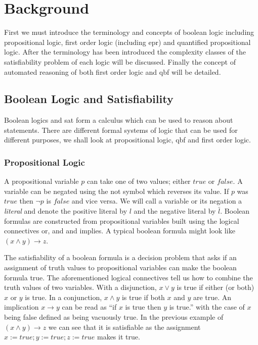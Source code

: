 \chapter{Background}
First we must introduce the terminology and concepts of boolean logic including propositional logic, first order logic (including \gls{epr}) and quantified propositional logic.
After the terminology has been introduced the complexity classes of the satisfiability problem of each logic will be discussed.
Finally the concept of automated reasoning of both first order logic and \gls{qbf} will be detailed.

\section{Boolean Logic and Satisfiability}
Boolean logics and \gls{sat} form a calculus which can be used to reason about statements. There are different formal systems of logic that can be used for different purposes, we shall look at propositional logic, \gls{qbf} and first order logic.

\subsection{Propositional Logic}
A propositional variable $p$ can take one of two values; either $true$ or $false$. A variable can be negated using the \gls{not} symbol which reverses its value. If $p$ was $true$ then $\neg p$ is $false$ and vice versa. We will call a variable or its negation a \textit{literal} and denote the positive literal by $l$ and the negative literal by $\bar{l}$.
Boolean formulas are constructed from propositional variables built using the logical connectives \gls{or}, \gls{and} and \gls{implies}. A typical boolean formula might look like $(x \land y) \to z$. 

The satisfiability of a boolean formula is a decision problem that asks if an assignment of truth values to propositional variables can make the boolean formula true. The aforementioned logical connectives tell us how to combine the truth values of two variables. With a disjunction, $x \lor y$ is true if either (or both) $x$ or $y$ is true. In a conjunction, $x \land y$ is true if both $x$ and $y$ are true. An implication $x \to y$ can be read as ``if $x$ is true then $y$ is true.'' with the case of $x$ being false defined as being vacuously true. In the previous example of $(x \land y) \to z$ we can see that it is satisfiable as the assignment $x := true; y := true; z := true$ makes it true.


